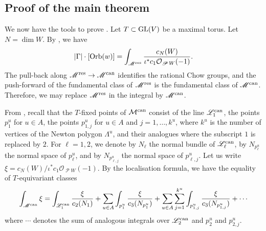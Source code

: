 \documentclass{amsart}
\DeclareMathOperator{\Orb}{Orb}
\DeclareMathOperator{\sP}{\mathscr P}
\renewcommand{\O}{\mathcal O}
\begin{document}
\subsection{Proof of the main theorem}
We now have the tools to prove .
Let \(T \subset \operatorname{GL}(V)\) be a maximal torus.
Let \(N = \dim W\).
By , we have
\[
  |\Gamma| \cdot [\Orb(w)] = \int_{\mathscr M^{\rm res}} \frac{c_{N}(W)}{\iota^{*}c_1 \O_{\sP W}(-1)}.
\]
The pull-back along \(\mathscr M^{\rm res} \to \mathscr M^{\rm can}\) identifies the rational Chow groups, and the push-forward of the fundamental class of \(\mathscr M^{\rm res}\) is the fundamental class of \(\mathscr M^{\rm can}\).
Therefore, we may replace \(\mathscr M^{\rm res}\) in the integral by \(\mathscr M^{\rm can}\).

From , recall that the \(T\)-fixed points of \(\mathcal M^{\rm can}\) consist of the line \(\mathscr L_1^{\rm can}\), the points \(p_1^u\) for \(u \in A\), the points \(p_{1,j}^u\) for \(u \in A\) and \(j = 1, \dots, k^u\), where \(k^u\) is the number of vertices of the Newton polygon \(\Lambda^u\), and their analogues where the subscript \(1\) is replaced by \(2\).
For \(\ell = 1,2\), we denote by \(N_{\ell}\) the normal bundle of \(\mathscr L_{\ell}^{\rm can}\), by \(N_{p_{\ell}^u}\) the normal space of \(p_{\ell}^u\), and by \(N_{p_{\ell,j}^u}\) the normal space of \(p_{\ell,j}^u\).
Let us write \( \xi = c_{N}(W) / \iota^{*}c_1 \O_{\sP W}(-1)\).
By the localisation formula, we have the equality of \(T\)-equivariant classes
\begin{equation}\label{eqn:bigsum}
  \begin{split}
    \int_{\mathscr M^{\rm can}} \xi = \int_{\mathscr L^{\rm can}_1} \frac{\xi}{c_{2}(N_1)} + \sum_{u \in A}\int_{p_1^u} \frac{\xi}{c_3(N_{p_1^u})} + \sum_{u \in A} \sum_{j = 1}^{k^u} \int_{p_{1,j}^u} \frac{\xi}{c_3(N_{p_{1,j}^u})} + \cdots
  \end{split}
\end{equation}
where \(\cdots\) denotes the sum of analogous integrals over \(\mathscr L_2^{\rm can}\) and \(p_2^u\) and \(p_{2,j}^u\).
\end{document}
